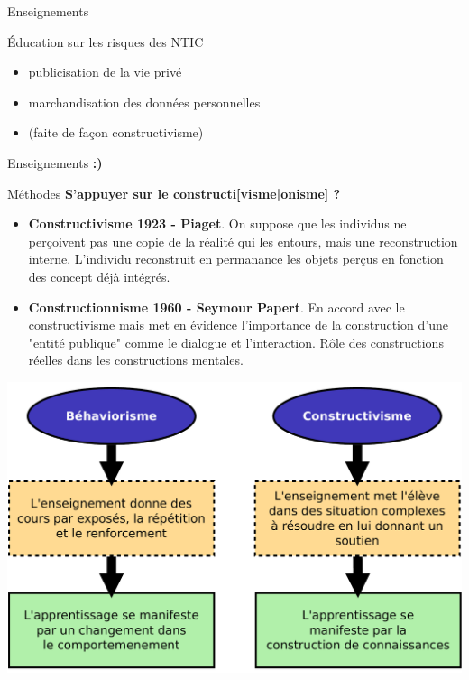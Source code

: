\begin{frame}{Enseignements}
  \begin{block}{Éducation sur les risques des NTIC}
    \begin{itemize}
      \item publicisation de la vie privé
      \item marchandisation des données personnelles
      \item (faite de façon constructivisme)
    \end{itemize}
  \end{block}
\end{frame} 



\begin{frame}{Enseignements}
\Huge \textbf{:)}
\end{frame}

\begin{frame}{Méthodes}
\textbf{\Huge  S'appuyer sur le constructi[visme|onisme] ?}
\begin{itemize}
  \item \textbf{Constructivisme 1923 - Piaget}. On suppose que les individus ne perçoivent pas une copie de la réalité qui les entours, mais une reconstruction interne. L'individu reconstruit en permanance les objets perçus en fonction des concept déjà intégrés.
  \item \textbf{Constructionnisme 1960 - Seymour Papert}. En accord avec le constructivisme mais met en évidence l'importance de la construction d'une "entité publique" comme le dialogue et l'interaction. Rôle des constructions réelles dans les constructions mentales.
\end{itemize}
\end{frame}

\begin{frame}
  \begin{center}  
\includegraphics[width=.8\textwidth]
  {../resources/illustrations/behaviorisme_constructivisme}
    \end{center}
\end{frame}


